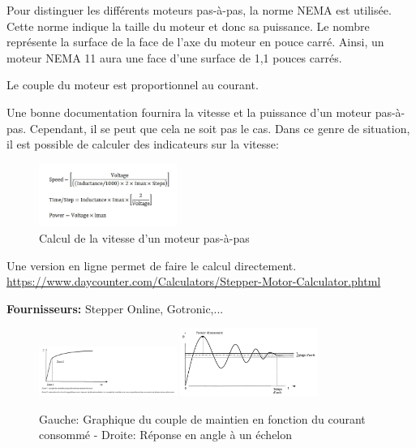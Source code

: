 \documentclass[a4paper, 11pt]{report}
\begin{document}
Pour distinguer les différents moteurs pas-à-pas, la norme NEMA est utilisée. Cette norme indique la taille du moteur et donc sa puissance. Le nombre représente la surface de la face de l'axe du moteur en pouce carré. Ainsi, un moteur NEMA 11 aura une face d'une surface de 1,1 pouces carrés.

Le couple du moteur est proportionnel au courant.

Une bonne documentation fournira la vitesse et la puissance d'un moteur pas-à-pas. Cependant, il se peut que cela ne soit pas le cas. Dans ce genre de situation, il est possible de calculer des indicateurs sur la vitesse:

\begin{figure}[h!]
\begin{centering}
\includegraphics[width=0.4\textwidth]{images/SpeedCalculator.jpeg}
\caption{Calcul de la vitesse d'un moteur pas-à-pas}
\par\end{centering}
\end{figure}

Une version en ligne permet de faire le calcul directement.
\url{https://www.daycounter.com/Calculators/Stepper-Motor-Calculator.phtml}

\textbf{Fournisseurs:} Stepper Online, Gotronic,...

\begin{figure}[h!]
\begin{centering}
\caption{Gauche: Graphique du couple de maintien en fonction du courant consommé - Droite: Réponse en angle à un échelon}
\includegraphics[width=0.4\textwidth]{images/CoupleMaintien.png}
\includegraphics[width=0.4\textwidth]{images/reponse_indicielleMPP.png}
\par\end{centering}
\end{figure}
\end{document}
